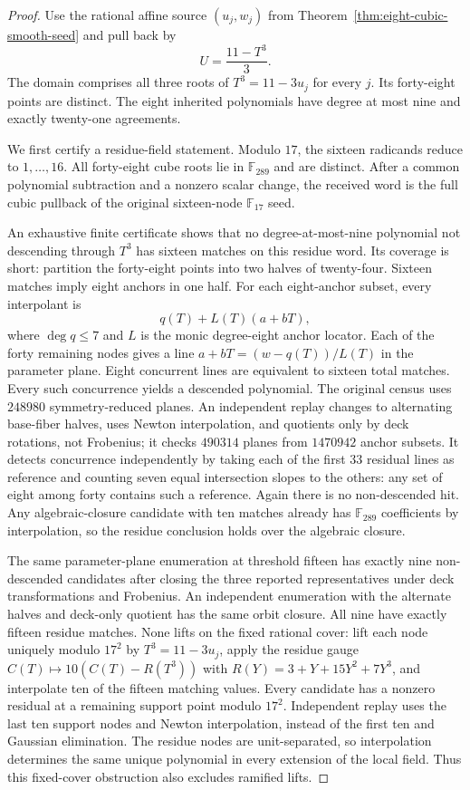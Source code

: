 \begin{proof}
Use the rational affine source $(u_j,w_j)$ from Theorem~\ref{thm:eight-cubic-smooth-seed} and pull back by
\[
 U=\frac{11-T^3}{3}.
\]
The domain comprises all three roots of $T^3=11-3u_j$ for every $j$. Its forty-eight points are distinct. The eight inherited polynomials have degree at most nine and exactly twenty-one agreements.

We first certify a residue-field statement. Modulo $17$, the sixteen radicands reduce to $1,\ldots,16$. All forty-eight cube roots lie in $\mathbb F_{289}$ and are distinct. After a common polynomial subtraction and a nonzero scalar change, the received word is the full cubic pullback of the original sixteen-node $\mathbb F_{17}$ seed.

An exhaustive finite certificate shows that no degree-at-most-nine polynomial not descending through $T^3$ has sixteen matches on this residue word. Its coverage is short: partition the forty-eight points into two halves of twenty-four. Sixteen matches imply eight anchors in one half. For each eight-anchor subset, every interpolant is
\[
 q(T)+L(T)(a+bT),
\]
where $\deg q\le7$ and $L$ is the monic degree-eight anchor locator. Each of the forty remaining nodes gives a line $a+bT=(w-q(T))/L(T)$ in the parameter plane. Eight concurrent lines are equivalent to sixteen total matches. Every such concurrence yields a descended polynomial. The original census uses $248980$ symmetry-reduced planes. An independent replay changes to alternating base-fiber halves, uses Newton interpolation, and quotients only by deck rotations, not Frobenius; it checks $490314$ planes from $1470942$ anchor subsets. It detects concurrence independently by taking each of the first $33$ residual lines as reference and counting seven equal intersection slopes to the others: any set of eight among forty contains such a reference. Again there is no non-descended hit. Any algebraic-closure candidate with ten matches already has $\mathbb F_{289}$ coefficients by interpolation, so the residue conclusion holds over the algebraic closure.

The same parameter-plane enumeration at threshold fifteen has exactly nine non-descended candidates after closing the three reported representatives under deck transformations and Frobenius. An independent enumeration with the alternate halves and deck-only quotient has the same orbit closure. All nine have exactly fifteen residue matches. None lifts on the fixed rational cover: lift each node uniquely modulo $17^2$ by $T^3=11-3u_j$, apply the residue gauge $C(T)\mapsto10(C(T)-R(T^3))$ with $R(Y)=3+Y+15Y^2+7Y^3$, and interpolate ten of the fifteen matching values. Every candidate has a nonzero residual at a remaining support point modulo $17^2$. Independent replay uses the last ten support nodes and Newton interpolation, instead of the first ten and Gaussian elimination. The residue nodes are unit-separated, so interpolation determines the same unique polynomial in every extension of the local field. Thus this fixed-cover obstruction also excludes ramified lifts.


\end{proof}
